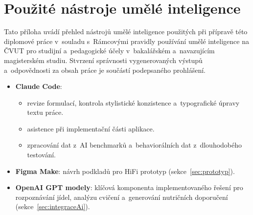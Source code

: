 \chapter{Použité nástroje umělé inteligence}
\label{app:aiNastroje}

Tato příloha uvádí přehled nástrojů umělé inteligence použitých při přípravě této diplomové práce v~souladu s~Rámcovými pravidly používání umělé inteligence na ČVUT pro studijní a~pedagogické účely v~bakalářském a~navazujícím magisterském studiu. Stvrzení správnosti vygenerovaných výstupů a~odpovědnosti za obsah práce je součástí podepsaného prohlášení.

\begin{itemize}\setlength{\itemsep}{2pt}
	\item \textbf{Claude Code}:
		\begin{itemize}\setlength{\itemsep}{1pt}
			\item revize formulací, kontrola stylistické konzistence a~typografické úpravy textu práce.
			\item asistence při implementační části aplikace.
			\item zpracování dat z~AI benchmarků a~behaviorálních dat z~dlouhodobého testování.
		\end{itemize}
	\item \textbf{Figma Make}: návrh podkladů pro HiFi prototyp (sekce~\ref{sec:prototyp}).
	\item \textbf{OpenAI GPT modely}: klíčová komponenta implementovaného řešení pro rozpoznávání jídel, analýzu cvičení a~generování nutričních doporučení (sekce~\ref{sec:integraceAi}).
\end{itemize}

